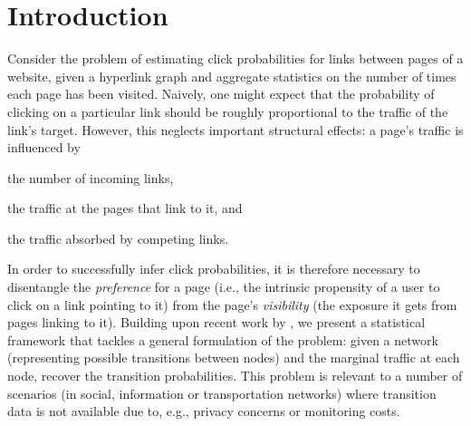 \section{Introduction}  %
\label{cr:sec:introduction}

Consider the problem of estimating click probabilities for links between pages of a website, given a hyperlink graph and aggregate statistics on the number of times each page has been visited.
Naively, one might expect that the probability of clicking on a particular link should be roughly proportional to the traffic of the link's target.
However, this neglects important structural effects:
a page's traffic is influenced by
\begin{enuminline}
\item the number of incoming links,
\item the traffic at the pages that link to it, and
\item the traffic absorbed by competing links.
\end{enuminline}
In order to successfully infer click probabilities, it is therefore necessary to disentangle the \emph{preference} for a page (i.e., the intrinsic propensity of a user to click on a link pointing to it) from the page's \emph{visibility} (the exposure it gets from pages linking to it).
Building upon recent work by \citet{kumar2015inverting}, we present a statistical framework that tackles a general formulation of the problem:
given a network (representing possible transitions between nodes) and the marginal traffic at each node, recover the transition probabilities.
This problem is relevant to a number of scenarios (in social, information or transportation networks) where transition data is not available due to, e.g., privacy concerns or monitoring costs.

